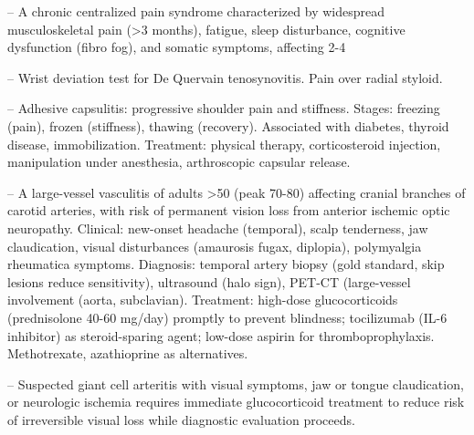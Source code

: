 -- A chronic centralized pain syndrome characterized by widespread musculoskeletal pain (>3 months), fatigue, sleep disturbance, cognitive dysfunction (fibro fog), and somatic symptoms, affecting 2-4%

-- Wrist deviation test for De Quervain tenosynovitis. Pain over radial styloid.

-- Adhesive capsulitis: progressive shoulder pain and stiffness. Stages: freezing (pain), frozen (stiffness), thawing (recovery). Associated with diabetes, thyroid disease, immobilization. Treatment: physical therapy, corticosteroid injection, manipulation under anesthesia, arthroscopic capsular release.

-- A large-vessel vasculitis of adults >50 (peak 70-80) affecting cranial branches of carotid arteries, with risk of permanent vision loss from anterior ischemic optic neuropathy. Clinical: new-onset headache (temporal), scalp tenderness, jaw claudication, visual disturbances (amaurosis fugax, diplopia), polymyalgia rheumatica symptoms. Diagnosis: temporal artery biopsy (gold standard, skip lesions reduce sensitivity), ultrasound (halo sign), PET-CT (large-vessel involvement (aorta, subclavian). Treatment: high-dose glucocorticoids (prednisolone 40-60 mg/day) promptly to prevent blindness; tocilizumab (IL-6 inhibitor) as steroid-sparing agent; low-dose aspirin for thromboprophylaxis. Methotrexate, azathioprine as alternatives.

-- Suspected giant cell arteritis with visual symptoms, jaw or tongue claudication, or neurologic ischemia requires immediate glucocorticoid treatment to reduce risk of irreversible visual loss while diagnostic evaluation proceeds.

